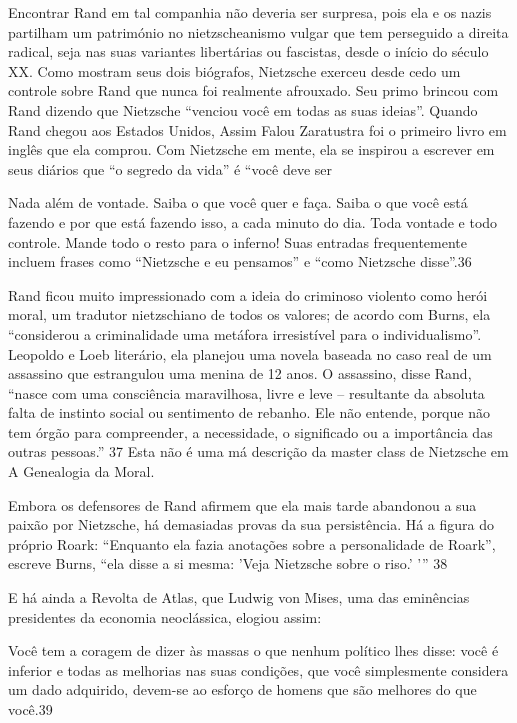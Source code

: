  \par 
Encontrar Rand em tal companhia não deveria ser surpresa, pois ela e os nazis partilham um património no nietzscheanismo vulgar que tem perseguido a direita radical, seja nas suas variantes libertárias ou fascistas, desde o início do século XX. Como mostram seus dois biógrafos, Nietzsche exerceu desde cedo um controle sobre Rand que nunca foi realmente afrouxado. Seu primo brincou com Rand dizendo que Nietzsche “venciou você em todas as suas ideias”. Quando Rand chegou aos Estados Unidos, Assim Falou Zaratustra foi o primeiro livro em inglês que ela comprou. Com Nietzsche em mente, ela se inspirou a escrever em seus diários que “o segredo da vida” é “você deve ser
 \par 
Nada além de vontade. Saiba o que você quer e faça. Saiba o que você está fazendo e por que está fazendo isso, a cada minuto do dia. Toda vontade e todo controle. Mande todo o resto para o inferno! Suas entradas frequentemente incluem frases como “Nietzsche e eu pensamos” e “como Nietzsche disse”.{\color{blue}36}
 \par 
Rand ficou muito impressionado com a ideia do criminoso violento como herói moral, um tradutor nietzschiano de todos os valores; de acordo com Burns, ela “considerou a criminalidade uma metáfora irresistível para o individualismo”. Leopoldo e Loeb literário, ela planejou uma novela baseada no caso real de um assassino que estrangulou uma menina de {\color{blue}12} anos. O assassino, disse Rand, “nasce com uma consciência maravilhosa, livre e leve – resultante da absoluta falta de instinto social ou sentimento de rebanho. Ele não entende, porque não tem órgão para compreender, a necessidade, o significado ou a importância das outras pessoas.” {\color{blue}37} Esta não é uma má descrição da master class de Nietzsche em A Genealogia da Moral.
 \par 
Embora os defensores de Rand afirmem que ela mais tarde abandonou a sua paixão por Nietzsche, há demasiadas provas da sua persistência. Há a figura do próprio Roark: “Enquanto ela fazia anotações sobre a personalidade de Roark”, escreve Burns, “ela disse a si mesma: 'Veja Nietzsche sobre o riso.' '” {\color{blue} 38 } {\par} E há ainda a Revolta de Atlas, que Ludwig von Mises, uma das eminências presidentes da economia neoclássica, elogiou assim:
 \par 
Você tem a coragem de dizer às massas o que nenhum político lhes disse: você é inferior e todas as melhorias nas suas condições, que você simplesmente considera um dado adquirido, devem-se ao esforço de homens que são melhores do que você.{\color{blue}39}
